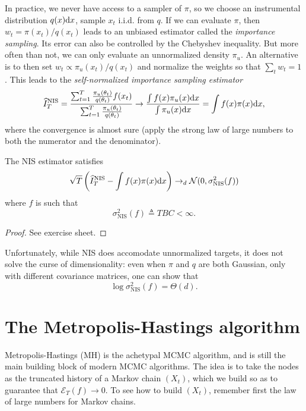 In practice, we never have access to a sampler of $\pi$, so we choose an instrumental distribution $q(x)\mathrm{d} x$, sample $x_t$ i.i.d. from $q$.
If we can evaluate $\pi$, then $w_t=\pi(x_t)/q(x_t)$ leads to an unbiased estimator called the \emph{importance sampling}.
Its error can also be controlled by the Chebyshev inequality. 
But more often than not, we can only evaluate an unnormalized density $\pi_u$. 
An alternative is to then set $w_t\propto \pi_u(x_t)/q(x_t)$ and normalize the weights so that $\sum_t w_t=1$. 
This leads to the \emph{self-normalized importance sampling estimator}
$$
\widehat I_T^\text{NIS} = \frac{\sum_{t=1}^T \frac{\pi_u(\theta_t)}{q(\theta_t)} f(x_t)}{\sum_{t=1}^T \frac{\pi_u(\theta_t)}{q(\theta_t)}} \rightarrow \frac{\int f(x)\pi_u(x)\mathrm{d} x}{\int \pi_u(x)\mathrm{d} x} = \int f(x)\pi(x)\mathrm{d} x,
$$
where the convergence is almost sure (apply the strong law of large numbers to both the numerator and the denominator).
\begin{proposition} The NIS estimator satisfies
   $$
   \sqrt{T} \left (\widehat I_T^\text{NIS} - \int f(x)\pi(x)\mathrm{d} x\right ) \rightarrow_d \mathcal{N}(0,\sigma_{\text{NIS}}^2(f))
   $$
   where $f$ is such that
   $$
   \sigma_{\text{NIS}}^2(f) \triangleq TBC <\infty.
   $$
\end{proposition}
\begin{proof}
    See exercise sheet.
\end{proof}
Unfortunately, while NIS does accomodate unnormalized targets, it does not solve the curse of dimensionality: even when $\pi$ and $q$ are both Gaussian, only with different covariance matrices, one can show that 
$$
\log \sigma_{\text{NIS}}^2(f) = \Theta(d).
$$

\section{The Metropolis-Hastings algorithm}
Metropolis-Hastings (MH) is the achetypal MCMC algorithm, and is still the main building block of modern MCMC algorithms. 
The idea is to take the nodes as the truncated history of a Markov chain $(X_t)$, which we build so as to guarantee that $\mathcal{E}_T(f)\rightarrow 0$.
To see how to build $(X_t)$, remember first the law of large numbers for Markov chains. 

